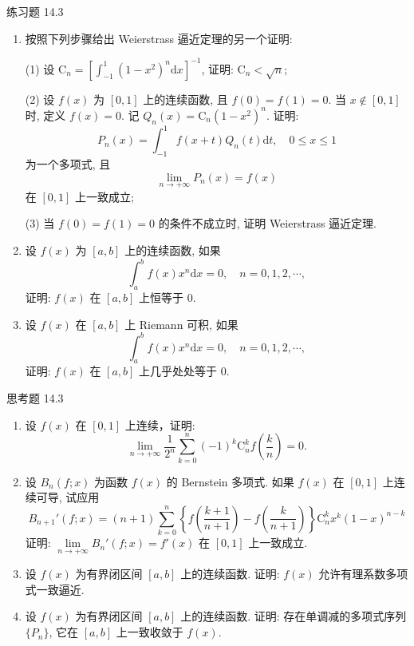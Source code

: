 \begin{exblock}{练习题 14.3}
\begin{enumerate}
  \item 按照下列步骤给出 Weierstrass 逼近定理的另一个证明:

  (1) 设 $\mathrm{C}_{n}=\left[\int_{-1}^{1}(1-x^{2})^{n}\mathrm{d}x\right]^{-1}$, 证明: $\mathrm{C}_{n}<\sqrt{n}$;

  (2) 设 $f(x)$ 为 $[0,1]$ 上的连续函数, 且 $f(0)=f(1)=0$. 当 $x\notin[0,1]$ 时, 定义 $f(x)=0$. 记 $Q_{n}(x)=\mathrm{C}_{n}(1-x^{2})^{n}$. 证明:
  \[
    P_{n}(x)=\int_{-1}^{1}f(x+t)Q_{n}(t)\mathrm{d}t,\quad0\leqslant x\leqslant1
\]
  为一个多项式, 且
  \[
    \lim_{n\to+\infty}P_{n}(x)=f(x)
\]
  在 $[0,1]$ 上一致成立;

  (3) 当 $f(0)=f(1)=0$ 的条件不成立时, 证明 Weierstrass 逼近定理.
  \item 设 $f(x)$ 为 $[a,b]$ 上的连续函数, 如果
  \[
    \int_{a}^{b}f(x)x^{n}\mathrm{d}x=0,\quad n=0,1,2,\cdots,
\]
  证明: $f(x)$ 在 $[a,b]$ 上恒等于 $0$.
  \item 设 $f(x)$ 在 $[a,b]$ 上 Riemann 可积, 如果
  \[
    \int_{a}^{b}f(x)x^{n}\mathrm{d}x=0,\quad n=0,1,2,\cdots,
\]
  证明: $f(x)$ 在 $[a,b]$ 上几乎处处等于 $0$.
\end{enumerate}
\end{exblock}

\begin{exblock}{思考题 14.3}
\begin{enumerate}
  \item 设 $f(x)$ 在 $[0,1]$ 上连续，证明:
  \[
    \lim_{n\to+\infty}\frac{1}{2^{n}}\sum_{k=0}^{n}(-1)^{k}\mathrm{C}_{n}^{k}f\left(\frac{k}{n}\right)=0.
\]
  \item 设 $B_{n}(f;x)$ 为函数 $f(x)$ 的 Bernstein 多项式. 如果 $f(x)$ 在 $[0,1]$ 上连续可导, 试应用
  \[
    B_{n+1}'(f;x)=(n+1)\sum_{k=0}^{n}\left\{f\left(\frac{k+1}{n+1}\right)-f\left(\frac{k}{n+1}\right)\right\}\mathrm{C}_{n}^{k}x^{k}(1-x)^{n-k}
\]
  证明: $\lim\limits_{n\to+\infty}B_{n}'(f;x)=f'(x)$ 在 $[0,1]$ 上一致成立.
  \item 设 $f(x)$ 为有界闭区间 $[a,b]$ 上的连续函数. 证明: $f(x)$ 允许有理系数多项式一致逼近.
  \item 设 $f(x)$ 为有界闭区间 $[a,b]$ 上的连续函数. 证明: 存在单调减的多项式序列 $\{P_{n}\}$, 它在 $[a,b]$ 上一致收敛于 $f(x)$.
\end{enumerate}
\end{exblock}
